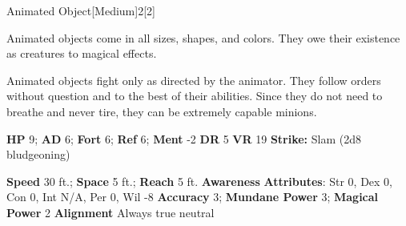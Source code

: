   
  \begin{monsection}{Animated Object}[Medium]{2}[2]
    \vspace{-1em}\vspace{-1em}
    \vspace{0em}

    
    Animated objects come in all sizes, shapes, and colors. They owe their existence as creatures to magical effects.

    Animated objects fight only as directed by the animator. They follow orders without question and to the best of their abilities. Since they do not need to breathe and never tire, they can be extremely capable minions.
  
    

    \begin{spellcontent}
      \begin{spelltargetinginfo}
        \pari \textbf{HP} 9;
          \textbf{AD} 6;
          \textbf{Fort} 6;
          \textbf{Ref} 6;
          \textbf{Ment} -2
        \pari \textbf{DR} 5
        \pari \textbf{VR} 19
        \pari \textbf{Strike:}
            Slam  (2d8 bludgeoning)
      \end{spelltargetinginfo}
    \end{spellcontent}
    \begin{monsterfooter}
      \pari \textbf{Speed} 30 ft.;
        \textbf{Space} 5 ft.;
        \textbf{Reach} 5 ft.
      \pari \textbf{Awareness} 
      \pari \textbf{Attributes}:
        Str 0, Dex 0,
        Con 0, Int N/A,
        Per 0, Wil -8
      \pari \textbf{Accuracy} 3;
        \textbf{Mundane Power} 3;
      \textbf{Magical Power} 2
      \pari \textbf{Alignment} Always true neutral
    \end{monsterfooter}
  \end{monsection}
  

